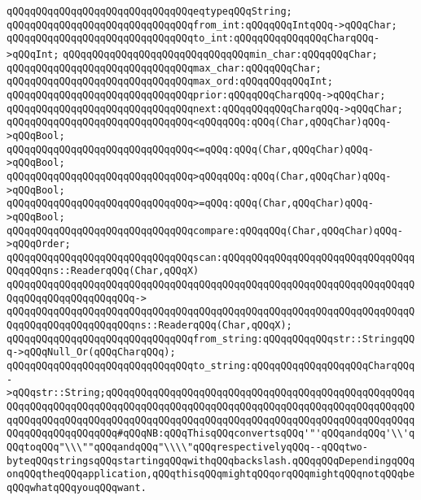 \verb|qQQqqQQqqQQqqQQqqQQqqQQqqQQqqQQqeqtypeqQQqString;|\newline
\newline
\verb|qQQqqQQqqQQqqQQqqQQqqQQqqQQqqQQqfrom_int:qQQqqQQqIntqQQq->qQQqChar;|\newline
\verb|qQQqqQQqqQQqqQQqqQQqqQQqqQQqqQQqto_int:qQQqqQQqqQQqqQQqCharqQQq->qQQqInt;|\newline
\newline
\verb|qQQqqQQqqQQqqQQqqQQqqQQqqQQqqQQqmin_char:qQQqqQQqChar;|\newline
\verb|qQQqqQQqqQQqqQQqqQQqqQQqqQQqqQQqmax_char:qQQqqQQqChar;|\newline
\verb|qQQqqQQqqQQqqQQqqQQqqQQqqQQqqQQqmax_ord:qQQqqQQqqQQqInt;|\newline
\newline
\verb|qQQqqQQqqQQqqQQqqQQqqQQqqQQqqQQqprior:qQQqqQQqCharqQQq->qQQqChar;|\newline
\verb|qQQqqQQqqQQqqQQqqQQqqQQqqQQqqQQqnext:qQQqqQQqqQQqCharqQQq->qQQqChar;|\newline
\newline
\verb|qQQqqQQqqQQqqQQqqQQqqQQqqQQqqQQq<qQQqqQQq:qQQq(Char,qQQqChar)qQQq->qQQqBool;|\newline
\verb|qQQqqQQqqQQqqQQqqQQqqQQqqQQqqQQq<=qQQq:qQQq(Char,qQQqChar)qQQq->qQQqBool;|\newline
\verb|qQQqqQQqqQQqqQQqqQQqqQQqqQQqqQQq>qQQqqQQq:qQQq(Char,qQQqChar)qQQq->qQQqBool;|\newline
\verb|qQQqqQQqqQQqqQQqqQQqqQQqqQQqqQQq>=qQQq:qQQq(Char,qQQqChar)qQQq->qQQqBool;|\newline
\newline
\verb|qQQqqQQqqQQqqQQqqQQqqQQqqQQqqQQqcompare:qQQqqQQq(Char,qQQqChar)qQQq->qQQqOrder;|\newline
\newline
\verb|qQQqqQQqqQQqqQQqqQQqqQQqqQQqqQQqscan:qQQqqQQqqQQqqQQqqQQqqQQqqQQqqQQqqQQqqQQqns::ReaderqQQq(Char,qQQqX)|\newline
\verb|qQQqqQQqqQQqqQQqqQQqqQQqqQQqqQQqqQQqqQQqqQQqqQQqqQQqqQQqqQQqqQQqqQQqqQQqqQQqqQQqqQQqqQQqqQQq->|\newline
\verb|qQQqqQQqqQQqqQQqqQQqqQQqqQQqqQQqqQQqqQQqqQQqqQQqqQQqqQQqqQQqqQQqqQQqqQQqqQQqqQQqqQQqqQQqqQQqns::ReaderqQQq(Char,qQQqX);|\newline
\newline
\verb|qQQqqQQqqQQqqQQqqQQqqQQqqQQqqQQqfrom_string:qQQqqQQqqQQqstr::StringqQQq->qQQqNull_Or(qQQqCharqQQq);|\newline
\verb|qQQqqQQqqQQqqQQqqQQqqQQqqQQqqQQqto_string:qQQqqQQqqQQqqQQqqQQqCharqQQq->qQQqstr::String;qQQqqQQqqQQqqQQqqQQqqQQqqQQqqQQqqQQqqQQqqQQqqQQqqQQqqQQqqQQqqQQqqQQqqQQqqQQqqQQqqQQqqQQqqQQqqQQqqQQqqQQqqQQqqQQqqQQqqQQqqQQqqQQqqQQqqQQqqQQqqQQqqQQqqQQqqQQqqQQqqQQqqQQqqQQqqQQqqQQqqQQqqQQqqQQqqQQqqQQqqQQqqQQqqQQq#qQQqNB:qQQqThisqQQqconvertsqQQq'"'qQQqandqQQq'\\'qQQqtoqQQq"\\\""qQQqandqQQq"\\\\"qQQqrespectivelyqQQq--qQQqtwo-byteqQQqstringsqQQqstartingqQQqwithqQQqbackslash.qQQqqQQqDependingqQQqonqQQqtheqQQqapplication,qQQqthisqQQqmightqQQqorqQQqmightqQQqnotqQQqbeqQQqwhatqQQqyouqQQqwant.|\newline
